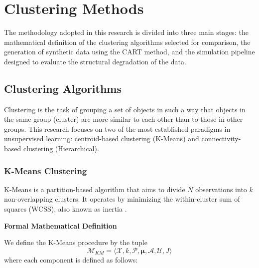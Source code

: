 \chapter{Clustering Methods}
\label{chap:methods}

The methodology adopted in this research is divided into three main stages: the mathematical definition of the clustering algorithms selected for comparison, the generation of synthetic data using the CART method, and the simulation pipeline designed to evaluate the structural degradation of the data.

\section{Clustering Algorithms}
\label{sec:clustering-algorithms}

Clustering is the task of grouping a set of objects in such a way that objects in the same group (cluster) are more similar to each other than to those in other groups. This research focuses on two of the most established paradigms in unsupervised learning: centroid-based clustering (K-Means) and connectivity-based clustering (Hierarchical).

\subsection{K-Means Clustering}
K-Means is a partition-based algorithm that aims to divide $N$ observations into $k$ non-overlapping clusters. It operates by minimizing the within-cluster sum of squares (WCSS), also known as inertia \cite{macqueen1967}.

\textbf{Formal Mathematical Definition}

We define the K-Means procedure by the tuple
\begin{equation}
  \mathcal{M}_{KM} = \langle \mathcal{X}, k, \mathcal{P}, \boldsymbol{\mu}, \mathcal{A}, \mathcal{U}, J \rangle
\end{equation}
where each component is defined as follows:


